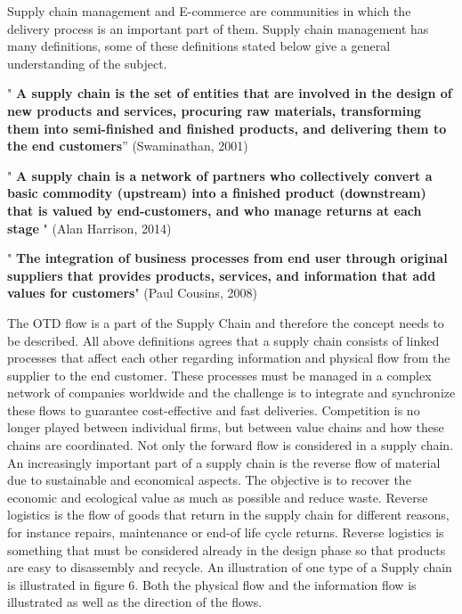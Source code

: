 \par Supply chain management and E-commerce are communities in which the delivery process is an important part of them. Supply chain management has many definitions, some of these definitions stated below give a general understanding of the subject.
\par" 
\textbf{A supply chain is the set of entities that are involved in the design of new products and services, procuring raw materials, transforming them into semi-finished and finished products, and delivering them to the end customers}” (Swaminathan, 2001)
\par "
\textbf {A supply chain is a network of partners who collectively convert a basic commodity (upstream) into a finished product (downstream) that is valued by end-customers, and who manage returns at each stage} " (Alan Harrison, 2014) 
\par"
\textbf{The integration of business processes from end user through original suppliers that provides products, services, and information that add values for customers}" (Paul Cousins, 2008)

\par
The OTD flow is a part of the Supply Chain and therefore the concept needs to be described. All above definitions agrees that a supply chain consists of linked processes that affect each other regarding information and physical flow from the supplier to the end customer. These processes must be managed in a complex network of companies worldwide and the challenge is to integrate and synchronize these flows to guarantee cost-effective and fast deliveries. Competition is no longer played between individual firms, but between value chains and how these chains are coordinated.
Not only the forward flow is considered in a supply chain. An increasingly important part of a supply chain is the reverse flow of material due to sustainable and economical aspects. The objective is to recover the economic and ecological value as much as possible and reduce waste.
Reverse logistics is the flow of goods that return in the supply chain for different reasons, for instance repairs, maintenance or end-of life cycle returns. Reverse logistics is something that must be considered already in the design phase so that products are easy to disassembly and recycle. An illustration of one type of a Supply chain is illustrated in figure 6. Both the physical flow and the information flow is illustrated as well as the direction of the flows.\cite{web015}

